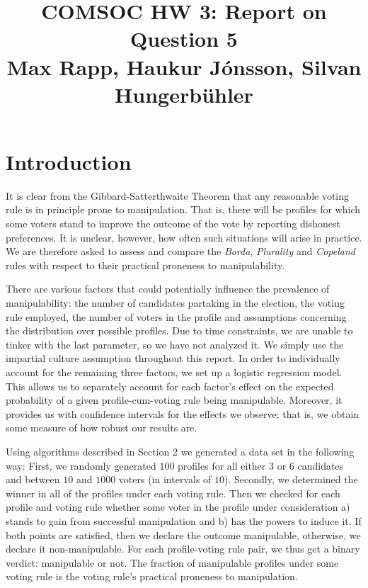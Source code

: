 \documentclass[10pt,a4paper]{article}
\title{%
  COMSOC HW 3: Report on Question 5 \\
  \large Max Rapp, Haukur J{\'o}nsson, Silvan Hungerb{\"u}hler}
\date{}
\begin{document}
\maketitle
\section{Introduction}
It is clear from the Gibbard-Satterthwaite Theorem that any reasonable voting rule is in principle prone to manipulation. That is, there will be profiles for which some voters stand to improve the outcome of the vote by reporting dishonest preferences. It is unclear, however, how often such situations will arise in practice. We are therefore asked to assess and compare the \textit{Borda}, \textit{Plurality} and \textit{Copeland} rules with respect to their practical proneness to manipulability.

There are various factors that could potentially influence the prevalence of manipulability: the number of candidates partaking in the election, the voting rule employed, the number of voters in the profile and assumptions concerning the distribution over possible profiles. Due to time constraints, we are unable to tinker with the last parameter, so we have not analyzed it. We simply use the impartial culture assumption throughout this report. In order to individually account for the remaining three factors, we set up a logistic regression model. This allows us to separately account for each factor's effect on the expected probability of a given profile-cum-voting rule being manipulable. Moreover, it provides us with confidence intervals for the effects we observe; that is, we obtain some measure of how robust our results are.

Using algorithms described in Section 2 we generated a data set in the following way:
First, we randomly generated $100$ profiles for all either $3$ or $6$ candidates and between $10$ and $1000$ voters (in intervals of $10$).  Secondly, we determined the winner in all of the profiles under each voting rule. Then we checked for each profile and voting rule whether some voter in the profile under consideration a) stands to gain from successful manipulation and b) has the powers to induce it. If both points are satisfied, then we declare the outcome manipulable, otherwise, we declare it non-manipulable. For each profile-voting rule pair, we thus get a binary verdict: manipulable or not. The fraction of manipulable profiles under some voting rule is the voting rule's practical proneness to manipulation.
\end{document}
